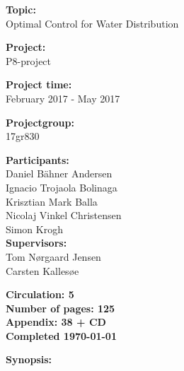 \begin{minipage}[t]{0.48\textwidth}
\textbf{Topic:} \\[5pt]\bigskip\hspace{2ex}
Optimal Control for Water Distribution

\textbf{Project:} \\[5pt]\bigskip\hspace{2ex}
P8-project

\textbf{Project time:} \\[5pt]\bigskip\hspace{2ex}
February 2017 - May 2017

\textbf{Projectgroup:} \\[5pt]\bigskip\hspace{2ex}
17gr830	

\textbf{Participants:} \\[5pt]\hspace*{2ex}
Daniel Bähner Andersen \\\hspace*{2ex}
Ignacio Trojaola Bolinaga \\\hspace*{2ex} 
Krisztian Mark Balla \\\hspace*{2ex}
Nicolaj Vinkel Christensen \\\hspace*{2ex}
Simon Krogh \\

\textbf{Supervisors:} \\[5pt]\hspace*{2ex}
Tom Nørgaard Jensen \\\hspace*{2ex}
Carsten Kallesøe \\\bigskip\hspace{2ex}

\vspace*{3.5cm}

\textbf{Circulation: 5} \\
\textbf{Number of pages: 125}\\
\textbf{Appendix: 38 + CD} \\
\textbf{Completed \today}\\
\end{minipage}
\hfill
\begin{minipage}[t]{0.483\textwidth}
\textbf{Synopsis:} \\[5pt]
\fbox{\parbox{7cm}{\bigskip\bigskip}}
\end{minipage}

\vfill